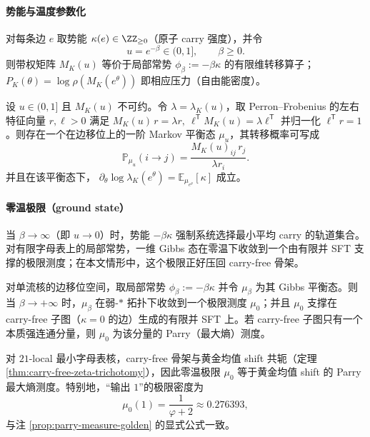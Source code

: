\paragraph{势能与温度参数化}
对每条边 \(e\) 取势能 \(\kappa(e)\in\ZZ_{\ge 0}\)（原子 carry 强度），并令
\[
u=e^{-\beta}\in(0,1],\qquad \beta\ge 0.
\]
则带权矩阵 \(M_K(u)\) 等价于局部常势 \(\phi_\beta:=-\beta\kappa\) 的有限维转移算子；\(P_K(\theta)=\log\rho(M_K(e^\theta))\) 即相应压力（自由能密度）。

\begin{proposition}\label{prop:kernel-equilibrium-pf}
设 \(u\in(0,1]\) 且 \(M_K(u)\) 不可约。令 \(\lambda=\lambda_K(u)\)，取 Perron--Frobenius 的左右特征向量 \(r,\ell>0\) 满足
\(
M_K(u)\,r=\lambda r,\ \ell^{\mathsf T}M_K(u)=\lambda \ell^{\mathsf T}
\)
并归一化 \(\ell^{\mathsf T}r=1\)。则存在一个在边移位上的一阶 Markov 平衡态 \(\mu_u\)，其转移概率可写成
\[
\mathbb{P}_{\mu_u}(i\to j)=\frac{M_K(u)_{ij}\,r_j}{\lambda r_i}.
\]
并且在该平衡态下，
\(
\partial_\theta \log\lambda_K(e^\theta)=\mathbb{E}_{\mu_{e^\theta}}[\kappa]
\)
成立。
\end{proposition}

\paragraph{零温极限（ground state）}
当 \(\beta\to\infty\)（即 \(u\to 0\)）时，势能 \(-\beta\kappa\) 强制系统选择最小平均 carry 的轨道集合。对有限字母表上的局部常势，一维 Gibbs 态在零温下收敛到一个由有限并 SFT 支撑的极限测度；在本文情形中，这个极限正好压回 carry-free 骨架。

\begin{theorem}\label{thm:kernel-zero-temp}
对单流核的边移位空间，取局部常势 \(\phi_\beta:=-\beta\kappa\) 并令 \(\mu_\beta\) 为其 Gibbs 平衡态。则当 \(\beta\to+\infty\) 时，\(\mu_\beta\) 在弱-\(\ast\) 拓扑下收敛到一个极限测度 \(\mu_0\)；并且 \(\mu_0\) 支撑在 carry-free 子图（\(\kappa=0\) 的边）生成的有限并 SFT 上。若 carry-free 子图只有一个本质强连通分量，则 \(\mu_0\) 为该分量的 Parry（最大熵）测度。
\end{theorem}

\begin{corollary}\label{cor:kernel-21-ground-state}
对 \(21\)-local 最小字母表核，carry-free 骨架与黄金均值 shift 共轭（定理 \ref{thm:carry-free-zeta-trichotomy}），因此零温极限 \(\mu_0\) 等于黄金均值 shift 的 Parry 最大熵测度。特别地，“输出 \(1\)”的极限密度为
\[
\mu_0(1)=\frac{1}{\varphi+2}\approx 0.276393,
\]
与注 \ref{prop:parry-measure-golden} 的显式公式一致。
\end{corollary}

